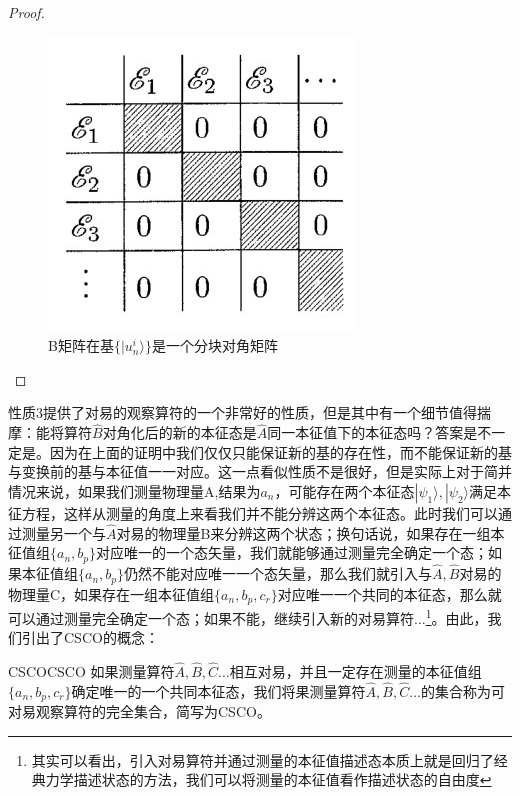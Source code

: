 \begin{proof}
         \begin{figure}[H]
            \centering
            \includegraphics{figure/multiblock.jpg}
            \caption{B矩阵在基$\{|u_n^i\rangle\}$是一个分块对角矩阵}
            \label{fig:multiblock}
        \end{figure}
        
    \end{proof}

性质3提供了对易的观察算符的一个非常好的性质，但是其中有一个细节值得揣摩：能将算符$\hat{B}$对角化后的新的本征态是$\hat{A}$同一本征值下的本征态吗？答案是不一定是。因为在上面的证明中我们仅仅只能保证新的基的存在性，而不能保证新的基与变换前的基与本征值一一对应。这一点看似性质不是很好，但是实际上对于简并情况来说，如果我们测量物理量A,结果为$a_n$，可能存在两个本征态$|\psi_1\rangle,|\psi_2\rangle$满足本征方程，这样从测量的角度上来看我们并不能分辨这两个本征态。此时我们可以通过测量另一个与$\hat{A}$对易的物理量B来分辨这两个状态；换句话说，如果存在一组本征值组$\{a_n,b_p\}$对应唯一的一个态矢量，我们就能够通过测量完全确定一个态；如果本征值组$\{a_n,b_p\}$仍然不能对应唯一一个态矢量，那么我们就引入与$\hat{A},\hat{B}$对易的物理量C，如果存在一组本征值组$\{a_n,b_p,c_r\}$对应唯一一个共同的本征态，那么就可以通过测量完全确定一个态；如果不能，继续引入新的对易算符$\dots$\footnote{其实可以看出，引入对易算符并通过测量的本征值描述态本质上就是回归了经典力学描述状态的方法，我们可以将测量的本征值看作描述状态的自由度}。由此，我们引出了CSCO的概念：
\begin{definition}{CSCO}{CSCO}
    如果测量算符$\hat{A},\hat{B},\hat{C}\dots$相互对易，并且一定存在测量的本征值组$\{a_n,b_p,c_r\}$确定唯一的一个共同本征态，我们将果测量算符$\hat{A},\hat{B},\hat{C}\dots$的集合称为可对易观察算符的完全集合，简写为CSCO。
\end{definition}

